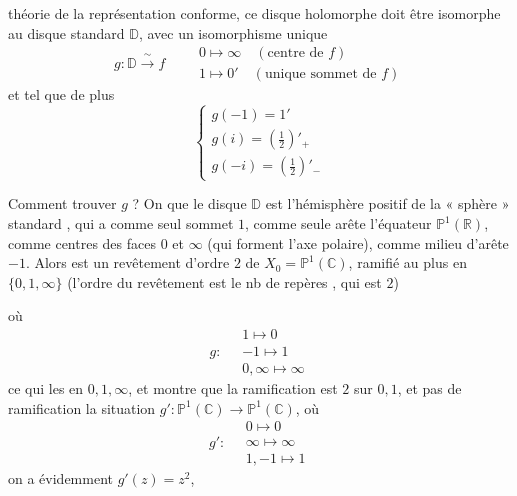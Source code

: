 \documentclass[11pt,a4paper]{article}
\begin{document}
théorie de la représentation conforme, ce disque holomorphe doit être isomorphe
au disque standard $\mathbb{D}$, avec un isomorphisme unique
\[
  g : \mathbb{D} \xrightarrow{\ \sim\ } f \qquad
  \begin{array}{l}
    0 \longmapsto \infty \quad (\text{centre de } f) \\
    1 \longmapsto 0' \quad (\text{unique sommet de } f)
  \end{array}
\]
et tel que de plus
\[
  \left\{
  \begin{array}{l}
    g(-1) = 1' \\
    g(i) = (\tfrac12)'_+ \\
    g(-i) = (\tfrac12)'_-
  \end{array}
  \right.
\]

Comment trouver $g$ ? On   que le disque $\mathbb{D}$
est l'hémisphère positif de la « sphère » standard 
, qui \struck{\ill{}} a comme seul sommet $1$,
comme seule arête l'équateur $\mathbb{P}^1(\mathbb{R})$, comme centres des
 faces $0$ et $\infty$ (qui forment l'axe polaire), comme milieu
d'arête $-1$. Alors  \struck{\ill{}} est un revêtement d'ordre $2$ de
$X_0 = \mathbb{P}^1(\mathbb{C})$, ramifié  au plus en
$\{0, 1, \infty\}$ (l'ordre du revêtement est le nb de repères
, qui est $2$)


où \struck{\ill{}}
\[
  g : \quad
  \begin{array}{l}
    1 \longmapsto 0 \\
    -1 \longmapsto 1 \\
    0, \infty \longmapsto \infty
  \end{array}
\]
ce qui  les  en $0, 1, \infty$, et montre que
la ramification est $2$ sur $0, 1$, et pas de ramification \struck{\ill{}}
 \ill{} la situation 
$g' : \mathbb{P}^1(\mathbb{C}) \to \mathbb{P}^1(\mathbb{C})$, 
où
\[
  g' : \quad
  \begin{array}{l}
    0 \longmapsto 0 \\
    \infty \longmapsto \infty \\
    1, -1 \longmapsto 1
  \end{array}
\]
on a \struck{\ill{}} évidemment $g'(z) = z^2$,
\end{document}
